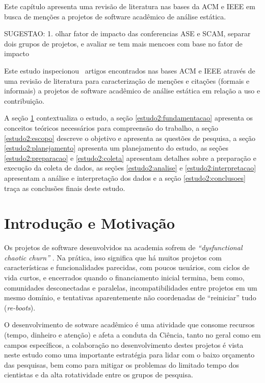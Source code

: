 {Este capítulo apresenta uma revisão de literatura nas bases da ACM e IEEE em
busca de menções a projetos de software acadêmico de análise estática.}
\label{estudo2}

SUGESTAO:
1. olhar fator de impacto das conferencias ASE e SCAM, separar dois grupos de
   projetos, e avaliar se tem mais mencoes com base no fator de impacto



Este estudo inspecionou \SearchUniqueCount \ artigos encontrados nas bases ACM
e IEEE através de uma revisão de literatura para caracterização de menções e
citações (formais e informais) a projetos de software acadêmico de análise
estática em relação a uso e contribuição.

A seção \ref{estudo2:introducao} contextualiza o estudo,
a seção \ref{estudo2:fundamentacao} apresenta os conceitos teóricos necessários para compreensão do trabalho,
a seção \ref{estudo2:escopo} descreve o objetivo e apresenta as questões de pesquisa,
a seção \ref{estudo2:planejamento} apresenta um planejamento do estudo,
as seções \ref{estudo2:preparacao} e \ref{estudo2:coleta} apresentam detalhes sobre a preparação e execução da coleta de dados,
as seções \ref{estudo2:analise} e \ref{estudo2:interpretacao} apresentam a análise e interpretação dos dados e
a seção \ref{estudo2:conclusoes} traça as conclusões finais deste estudo.

\section{Introdução e Motivação} \label{estudo2:introducao} %

Os projetos de software desenvolvidos na academia sofrem de {\it
``dysfunctional chaotic churn''} \cite{howison2015understanding}.
Na prática, isso significa que há muitos projetos com características e
funcionalidades parecidas, com poucos usuários, com ciclos de vida curtos, e
encerrados quando o financiamento inicial termina, bem como, comunidades
desconectadas e paralelas, incompatibilidades entre projetos em um mesmo
domínio, e tentativas aparentemente não coordenadas de ``reiniciar'' tudo ({\it re-boots}). 

O desenvolvimento de sotware acadêmico é uma atividade que consome recursos
(tempo, dinheiro e atenção) e afeta a conduta da Ciência, tanto no geral como
em campos específicos, a colaboração no desenvolvimento destes projetos é vista
neste estudo como uma importante estratégia para lidar com o baixo orçamento
das pesquisas, bem como para mitigar os problemas do limitado tempo dos
cientistas e da alta rotatividade entre os grupos de pesquisa.

